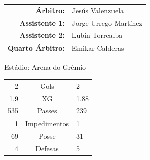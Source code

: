\documentclass[11pt]{article}
\begin{document}
\vspace{0.5cm}
\begin{minipage}{0.65\textwidth}
\begin{center}
\begin{tabular}{rl}
\textbf{Árbitro:} & Jesús Valenzuela \\
\textbf{Assistente 1:} & Jorge Urrego Martínez \\
\textbf{Assistente 2:} & Lubin Torrealba \\
\textbf{Quarto Árbitro:} & Emikar Calderas \\
\end{tabular}
\end{center}
\end{minipage}
\begin{minipage}{0.3\textwidth}
Estádio: Arena do Grêmio\\
\begin{tabular}{rcl}
2 & Gols & 2 \\
1.9 & XG & 1.88 \\
535 & Passes & 239 \\
1 & Impedimentos & 1 \\
69 & Posse & 31 \\
4 & Defesas & 5 \\
\end{tabular}
\end{minipage}
\newpage
\end{document}
